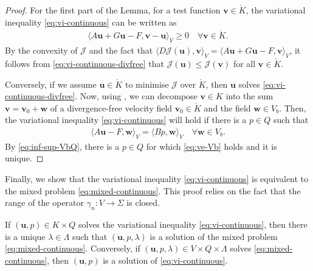 \documentclass[onefignum,onetabnum]{siamart190516}
\newcommand{\bu}{\boldsymbol{u}}
\newcommand{\bv}{\boldsymbol{v}}
\newcommand{\bw}{\boldsymbol{w}}
\newcommand{\Ko}{\mathring{K}}
\newcommand{\Jc}{\mathcal{J}}
\begin{document}
\begin{proof}
	For the first part of the Lemma, for a test function $\bv\in \Ko$, the variational inequality \eqref{eq:vi-continuous} can be written as 
	\begin{align}\label{eq:vi-continuous-divfree}
		\langle A\bu + G\bu - F, \bv - \bu \rangle_V \geq 0 \quad \forall \bv\in \Ko.
	\end{align}
	By the convexity of $\Jc$ and the fact that $\langle D\Jc(\bu), \bv \rangle_V = \langle A\bu + G\bu - F,\bv\rangle_V$, it follows from \eqref{eq:vi-continuous-divfree} that $\Jc(\bu) \leq \Jc(\bv)$ for all $\bv\in \Ko$.
	
	Conversely, if we assume $\bu\in\Ko$ to minimise $\Jc$ over $\Ko$, then $\bu$ solves \eqref{eq:vi-continuous-divfree}. Now, using \cite[Lemma 3.3]{amrouche1994}, we can decompose $\bv\in K$ into the sum $\bv = \bv_0 + \bw$ of a divergence-free velocity field $\bv_0\in \Ko$ and the field $\bw\in V_b$. Then, the variational inequality \eqref{eq:vi-continuous} will hold if there is a $p\in Q$ such that
	\begin{align}\label{eq:ve-Vb}
		\langle A\bu - F, \bw \rangle_V = \langle Bp,\bw \rangle_V \quad \forall \bw\in V_b.
	\end{align}
	By \eqref{eq:inf-sup-VbQ}, there is a $p\in Q$ for which \eqref{eq:ve-Vb} holds and it is unique.
\end{proof}

Finally, we show that the variational inequality \eqref{eq:vi-continuous} is equivalent to the mixed problem \eqref{eq:mixed-continuous}. This proof relies on the fact that the range of the operator $\gamma_n : V \to \Sigma$ is closed.

\begin{lemma}\label{lemma:equivalence-mixed-vi}
	If $(\bu,p)\in K\times Q$ solves the variational inequality \eqref{eq:vi-continuous}, then there is a unique $\lambda\in\Lambda$ such that $(\bu,p,\lambda)$ is a solution of the mixed problem \eqref{eq:mixed-continuous}. Conversely, if $(\bu,p,\lambda)\in V\times Q\times \Lambda$ solves \eqref{eq:mixed-continuous}, then $(\bu,p)$ is a solution of \eqref{eq:vi-continuous}.
\end{lemma}
\end{document}
